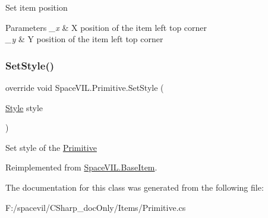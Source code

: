 Set item position 


\begin{DoxyParams}{Parameters}
{\em \+\_\+x} & X position of the item left top corner \\
\hline
{\em \+\_\+y} & Y position of the item left top corner \\
\hline
\end{DoxyParams}
\mbox{\label{class_space_v_i_l_1_1_primitive_ad2a9fbb75eddf7f36af72385a5453fb2}} 
\subsubsection{\texorpdfstring{Set\+Style()}{SetStyle()}}
{\footnotesize\ttfamily override void Space\+V\+I\+L.\+Primitive.\+Set\+Style (\begin{DoxyParamCaption}\item[{\mbox{\hyperlink{class_space_v_i_l_1_1_decorations_1_1_style}{Style}}}]{style }\end{DoxyParamCaption})\hspace{0.3cm}{\ttfamily [virtual]}}



Set style of the \mbox{\hyperlink{class_space_v_i_l_1_1_primitive}{Primitive}} 



Reimplemented from \mbox{\hyperlink{class_space_v_i_l_1_1_base_item_a74dec9854f0a7553ad3b50f140bfe07d}{Space\+V\+I\+L.\+Base\+Item}}.



The documentation for this class was generated from the following file\+:\begin{DoxyCompactItemize}
\item 
F\+:/spacevil/\+C\+Sharp\+\_\+doc\+Only/\+Items/Primitive.\+cs\end{DoxyCompactItemize}
